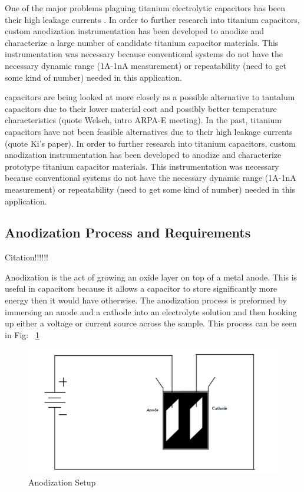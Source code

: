 \documentclass[journal]{IEEEtran}
\begin{document}
One of the major problems plaguing titanium electrolytic capacitors has been their high leakage currents \cite{tiCharHag}. In order to further research into titanium capacitors, custom anodization instrumentation has been developed to anodize and characterize a large number of candidate titanium capacitor materials. This instrumentation was necessary because conventional systems do not have the necessary dynamic range (1A-1nA measurement) or repeatability (need to get some kind of number) needed in this application.



 capacitors are being looked at more closely as a possible alternative to tantalum capacitors due to their lower material cost and possibly better temperature characteristics (quote Welsch, intro ARPA-E meeting). In the past, titanium capacitors have not been feasible alternatives due to their high leakage currents (quote Ki’s paper). In order to further research into titanium capacitors, custom anodization instrumentation has been developed to anodize and characterize prototype titanium capacitor materials. This instrumentation was necessary because conventional systems do not have the necessary dynamic range (1A-1nA measurement) or repeatability (need to get some kind of number) needed in this application.


\subsection{Anodization Process and Requirements}

Citation!!!!!!
\cite{knuth84}
\cite{tiCharHag}

Anodization is the act of growing an oxide layer on top of a metal anode. This is useful in capacitors because it allows a capacitor to store significantly more energy then it would have otherwise. The anodization process is preformed by immersing an anode and a cathode into an electrolyte solution and then hooking up either a voltage or current source across the sample. This process can be seen in Fig:  ~\ref{fig:anodSetup}

\begin{figure}[here]
\centering
\includegraphics{anodSetup}
\caption{Anodization Setup}
\label{fig:anodSetup}
\end{figure}
\end{document}
